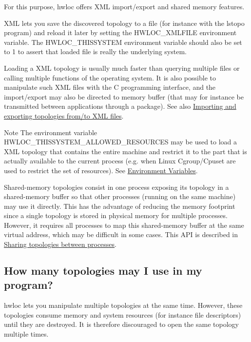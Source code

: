 For this purpose, hwloc offers X\+ML import/export and shared memory features.

X\+ML lets you save the discovered topology to a file (for instance with the lstopo program) and reload it later by setting the H\+W\+L\+O\+C\+\_\+\+X\+M\+L\+F\+I\+LE environment variable. The H\+W\+L\+O\+C\+\_\+\+T\+H\+I\+S\+S\+Y\+S\+T\+EM environment variable should also be set to 1 to assert that loaded file is really the underlying system.

Loading a X\+ML topology is usually much faster than querying multiple files or calling multiple functions of the operating system. It is also possible to manipulate such X\+ML files with the C programming interface, and the import/export may also be directed to memory buffer (that may for instance be transmitted between applications through a package). See also \hyperlink{a00388}{Importing and exporting topologies from/to X\+ML files}.

\begin{DoxyNote}{Note}
The environment variable H\+W\+L\+O\+C\+\_\+\+T\+H\+I\+S\+S\+Y\+S\+T\+E\+M\+\_\+\+A\+L\+L\+O\+W\+E\+D\+\_\+\+R\+E\+S\+O\+U\+R\+C\+ES may be used to load a X\+ML topology that contains the entire machine and restrict it to the part that is actually available to the current process (e.\+g. when Linux Cgroup/\+Cpuset are used to restrict the set of resources). See \hyperlink{a00382}{Environment Variables}.
\end{DoxyNote}
Shared-\/memory topologies consist in one process exposing its topology in a shared-\/memory buffer so that other processes (running on the same machine) may use it directly. This has the advantage of reducing the memory footprint since a single topology is stored in physical memory for multiple processes. However, it requires all processes to map this shared-\/memory buffer at the same virtual address, which may be difficult in some cases. This A\+PI is described in \hyperlink{a00226}{Sharing topologies between processes}.\hypertarget{a00394_faq_multitopo}{}\subsection{How many topologies may I use in my program?}\label{a00394_faq_multitopo}
hwloc lets you manipulate multiple topologies at the same time. However, these topologies consume memory and system resources (for instance file descriptors) until they are destroyed. It is therefore discouraged to open the same topology multiple times.

